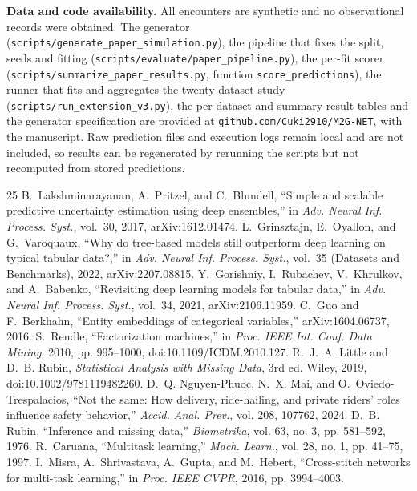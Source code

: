 \documentclass[9pt, conference, a4paper, compsocconf]{IEEEtran}
\begin{document}
\textbf{Data and code availability.} All encounters are synthetic and no observational records were obtained. The generator (\texttt{scripts/generate\_paper\_simulation.py}), the pipeline that fixes the split, seeds and fitting (\texttt{scripts/evaluate/paper\_pipeline.py}), the per-fit scorer (\texttt{scripts/summarize\_paper\_results.py}, function \texttt{score\_predictions}), the runner that fits and aggregates the twenty-dataset study (\texttt{scripts/run\_extension\_v3.py}), the per-dataset and summary result tables and the generator specification are provided at \texttt{github.com/Cuki2910/M2G-NET}, with the manuscript. Raw prediction files and execution logs remain local and are not included, so results can be regenerated by rerunning the scripts but not recomputed from stored predictions.

\balance
\begin{thebibliography}{25}
 B.~Lakshminarayanan, A.~Pritzel, and C.~Blundell, ``Simple and scalable predictive uncertainty estimation using deep ensembles,'' in \emph{Adv. Neural Inf. Process. Syst.}, vol.~30, 2017, arXiv:1612.01474.
 L.~Grinsztajn, E.~Oyallon, and G.~Varoquaux, ``Why do tree-based models still outperform deep learning on typical tabular data?,'' in \emph{Adv. Neural Inf. Process. Syst.}, vol.~35 (Datasets and Benchmarks), 2022, arXiv:2207.08815.
 Y.~Gorishniy, I.~Rubachev, V.~Khrulkov, and A.~Babenko, ``Revisiting deep learning models for tabular data,'' in \emph{Adv. Neural Inf. Process. Syst.}, vol.~34, 2021, arXiv:2106.11959.
 C.~Guo and F.~Berkhahn, ``Entity embeddings of categorical variables,'' arXiv:1604.06737, 2016.
 S.~Rendle, ``Factorization machines,'' in \emph{Proc. IEEE Int. Conf. Data Mining}, 2010, pp. 995--1000, doi:10.1109/ICDM.2010.127.
 R.~J.~A. Little and D.~B. Rubin, \emph{Statistical Analysis with Missing Data}, 3rd ed. Wiley, 2019, doi:10.1002/9781119482260.
 D.~Q. Nguyen-Phuoc, N.~X. Mai, and O.~Oviedo-Trespalacios, ``Not the same: How delivery, ride-hailing, and private riders' roles influence safety behavior,'' \emph{Accid. Anal. Prev.}, vol. 208, 107762, 2024.
 D.~B. Rubin, ``Inference and missing data,'' \emph{Biometrika}, vol. 63, no. 3, pp. 581--592, 1976.
 R.~Caruana, ``Multitask learning,'' \emph{Mach. Learn.}, vol. 28, no. 1, pp. 41--75, 1997.
 I.~Misra, A.~Shrivastava, A.~Gupta, and M.~Hebert, ``Cross-stitch networks for multi-task learning,'' in \emph{Proc. IEEE CVPR}, 2016, pp. 3994--4003.

\end{thebibliography}
\end{document}
